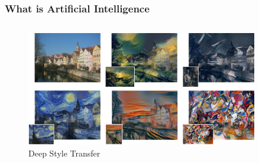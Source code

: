 \documentclass[aspectratio=169]{beamer}
\begin{document}
  \begin{frame}
    \frametitle{What is Artificial Intelligence}
    \begin{columns}
      \begin{column}{0.9\textwidth}
        \begin{figure}[th!]
          \centering
          \includegraphics[width=0.9\textwidth]{style-transfer.jpeg}
          \caption{Deep Style Transfer}
          \label{fig:jim_carrey}
        \end{figure}
      \end{column}
    \end{columns}
  \end{frame}
\end{document}
